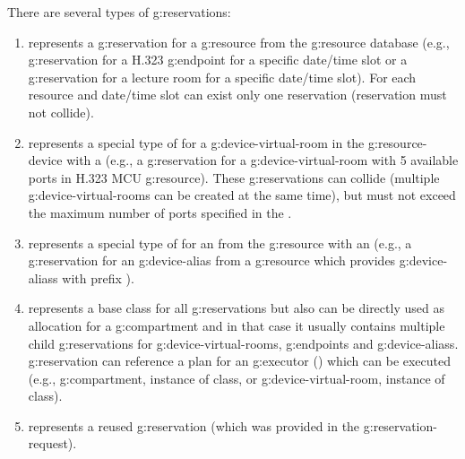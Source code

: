 There are several types of \glspl{g:reservation}:
\begin{enumerate}
\item {} represents a \gls{g:reservation} for a \gls{g:resource} from the \gls{g:resource} database (e.g., \gls{g:reservation} for a H.323 \gls{g:endpoint} for a specific date/time slot or a \gls{g:reservation} for a lecture room for a specific date/time slot). For each resource and date/time slot can exist only one reservation (reservation must not collide).

\item {} represents a special type of  for a \gls{g:device-virtual-room} in the \gls{g:resource-device} with a  (e.g., a \gls{g:reservation} for a \gls{g:device-virtual-room} with 5 available ports in H.323 MCU \gls{g:resource}). These \glspl{g:reservation} can collide (multiple \glspl{g:device-virtual-room} can be created at the same time), but must not exceed the maximum number of ports specified in the .

\item {} represents a special type of  for an  from the \gls{g:resource} with an  (e.g., a \gls{g:reservation} for an \gls{g:device-alias}  from a \gls{g:resource} which provides \glspl{g:device-alias} with prefix ).

\item {} represents a base class for all \glspl{g:reservation} but also can be directly used as allocation for a \gls{g:compartment} and in that case it usually contains multiple child \glspl{g:reservation} for \glspl{g:device-virtual-room}, \glspl{g:endpoint} and \glspl{g:device-alias}. \Gls{g:reservation} can reference a plan for an \gls{g:executor} () which can be executed (e.g., \gls{g:compartment}, instance of  class, or \gls{g:device-virtual-room}, instance of  class).

\item {} represents a reused \gls{g:reservation} (which was provided in the \gls{g:reservation-request}).
\end{enumerate}

